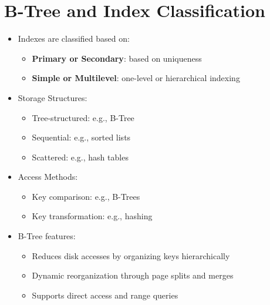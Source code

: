 \section{B-Tree and Index Classification}
\begin{itemize}
	\item Indexes are classified based on:
	\begin{itemize}
		\item \textbf{Primary or Secondary}: based on uniqueness
		\item \textbf{Simple or Multilevel}: one-level or hierarchical indexing
	\end{itemize}
	\item Storage Structures:
	\begin{itemize}
		\item Tree-structured: e.g., B-Tree
		\item Sequential: e.g., sorted lists
		\item Scattered: e.g., hash tables
	\end{itemize}
	\item Access Methods:
	\begin{itemize}
		\item Key comparison: e.g., B-Trees
		\item Key transformation: e.g., hashing
	\end{itemize}
	\item B-Tree features:
	\begin{itemize}
		\item Reduces disk accesses by organizing keys hierarchically
		\item Dynamic reorganization through page splits and merges
		\item Supports direct access and range queries
	\end{itemize}
\end{itemize}

